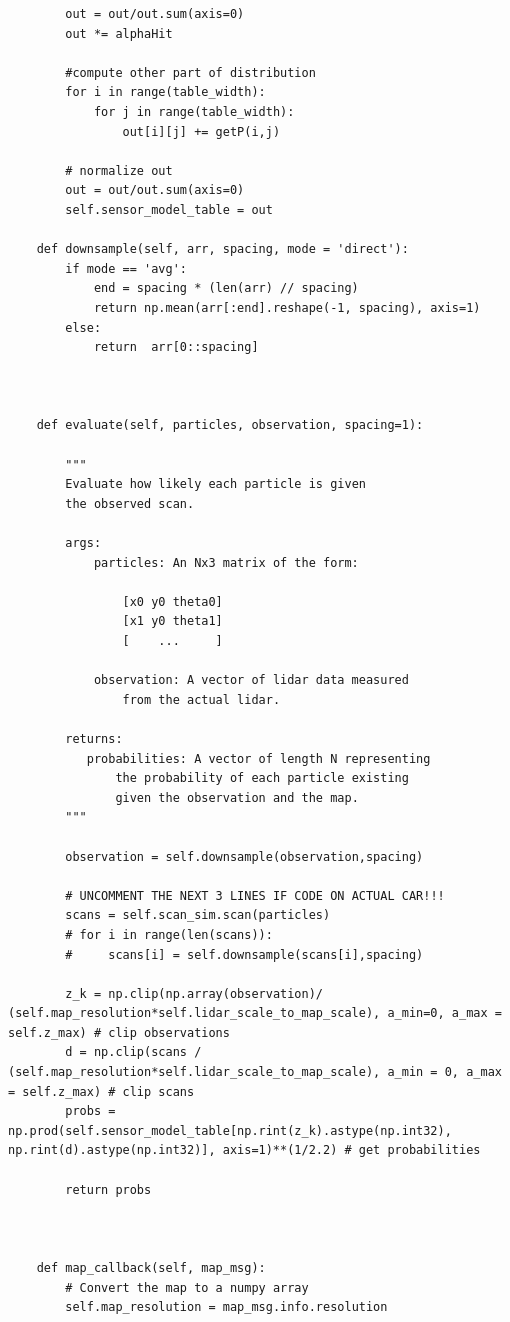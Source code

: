 \documentclass{article}
\begin{document}
{\begin{verbatim}
        out = out/out.sum(axis=0)
        out *= alphaHit
        
        #compute other part of distribution
        for i in range(table_width):
            for j in range(table_width):
                out[i][j] += getP(i,j)

        # normalize out
        out = out/out.sum(axis=0)
        self.sensor_model_table = out

    def downsample(self, arr, spacing, mode = 'direct'):
        if mode == 'avg':
            end = spacing * (len(arr) // spacing)
            return np.mean(arr[:end].reshape(-1, spacing), axis=1)
        else:
            return  arr[0::spacing]



    def evaluate(self, particles, observation, spacing=1):
        
        """
        Evaluate how likely each particle is given
        the observed scan.

        args:
            particles: An Nx3 matrix of the form:
            
                [x0 y0 theta0]
                [x1 y0 theta1]
                [    ...     ]

            observation: A vector of lidar data measured
                from the actual lidar.

        returns:
           probabilities: A vector of length N representing
               the probability of each particle existing
               given the observation and the map.
        """

        observation = self.downsample(observation,spacing)

        # UNCOMMENT THE NEXT 3 LINES IF CODE ON ACTUAL CAR!!!
        scans = self.scan_sim.scan(particles)
        # for i in range(len(scans)):
        #     scans[i] = self.downsample(scans[i],spacing)

        z_k = np.clip(np.array(observation)/ (self.map_resolution*self.lidar_scale_to_map_scale), a_min=0, a_max = self.z_max) # clip observations
        d = np.clip(scans / (self.map_resolution*self.lidar_scale_to_map_scale), a_min = 0, a_max = self.z_max) # clip scans
        probs = np.prod(self.sensor_model_table[np.rint(z_k).astype(np.int32), np.rint(d).astype(np.int32)], axis=1)**(1/2.2) # get probabilities

        return probs

            

    def map_callback(self, map_msg):
        # Convert the map to a numpy array
        self.map_resolution = map_msg.info.resolution


\end{verbatim}}
\end{document}
